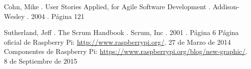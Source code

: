 \begin{thebibliography}{99}
 Cohn, Mike . User Stories Applied, for Agile Software Development . Addison-Wesley . 2004 . Página 121



 Sutherland, Jeff . The Scrum Handbook . Scrum, Inc . 2001 . Página 6
 Página oficial de Raspberry Pi: \url{http://www.raspberrypi.org/}. 27 de Marzo de 2014
 Componentes de Raspberry Pi: \url{https://www.raspberrypi.org/blog/new-graphic/}. 8 de Septiembre de 2015
\end{thebibliography}
